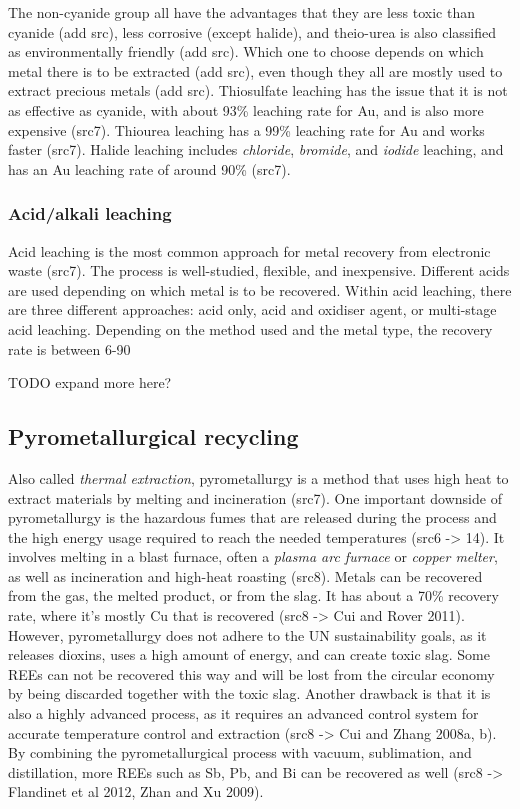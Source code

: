 The non-cyanide group all have the advantages that they are less toxic than cyanide (add src), less corrosive (except halide), and theio-urea is also classified as environmentally friendly (add src). Which one to choose depends on which metal there is to be extracted (add src), even though they all are mostly used to extract precious metals (add src). Thiosulfate leaching has the issue that it is not as effective as cyanide, with about 93\% leaching rate for Au, and is also more expensive (src7). Thiourea leaching has a 99\% leaching rate for Au and works faster (src7). Halide leaching includes \textit{chloride}, \textit{bromide}, and \textit{iodide} leaching, and has an Au leaching rate of around 90\% (src7).

\subsubsection{Acid/alkali leaching}

Acid leaching is the most common approach for metal recovery from electronic waste (src7). The process is well-studied, flexible, and inexpensive. Different acids are used depending on which metal is to be recovered. Within acid leaching, there are three different approaches: acid only, acid and oxidiser agent, or multi-stage acid leaching. Depending on the method used and the metal type, the recovery rate is between 6-90%

TODO expand more here?

\subsection{Pyrometallurgical recycling}

Also called \textit{thermal extraction}, pyrometallurgy is a method that uses high heat to extract materials by melting and incineration (src7). One important downside of pyrometallurgy is the hazardous fumes that are released during the process and the high energy usage required to reach the needed temperatures (src6 -> 14). It involves melting in a blast furnace, often a \textit{plasma arc furnace} or \textit{copper melter}, as well as incineration and high-heat roasting (src8). Metals can be recovered from the gas, the melted product, or from the slag. It has about a 70\% recovery rate, where it's mostly Cu that is recovered (src8 -> Cui and Rover 2011). However, pyrometallurgy does not adhere to the UN sustainability goals, as it releases dioxins, uses a high amount of energy, and can create toxic slag. Some REEs can not be recovered this way and will be lost from the circular economy by being discarded together with the toxic slag. Another drawback is that it is also a highly advanced process, as it requires an advanced control system for accurate temperature control and extraction (src8 -> Cui and Zhang 2008a, b). By combining the pyrometallurgical process with vacuum, sublimation, and distillation, more REEs such as Sb, Pb, and Bi can be recovered as well (src8 -> Flandinet et al 2012, Zhan and Xu 2009).

